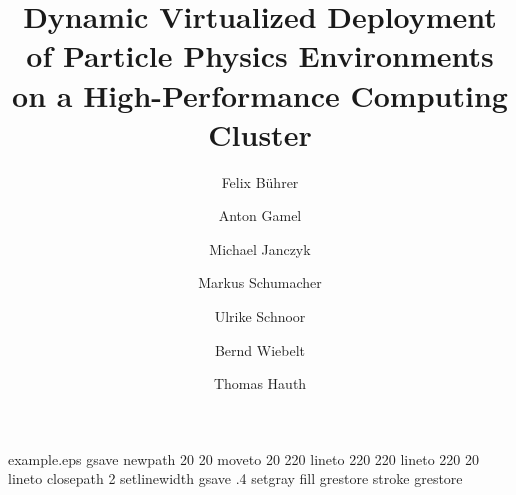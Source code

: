 %
%
%
%
%
\begin{filecontents*}{example.eps}
gsave
newpath
  20 20 moveto
  20 220 lineto
  220 220 lineto
  220 20 lineto
closepath
2 setlinewidth
gsave
  .4 setgray fill
grestore
stroke
grestore
\end{filecontents*}
%
\RequirePackage{fix-cm}
%
\documentclass[twocolumn]{svjour3}          %
%
\smartqed  %
%
\usepackage{graphicx}
%
%
\usepackage{url}
%
%
%


\title{Dynamic Virtualized Deployment of Particle Physics Environments on a
  High-Performance Computing Cluster%
}


\author{Felix B\"uhrer \and Anton Gamel  \and Michael Janczyk \and
  Markus Schumacher \and
  Ulrike Schnoor \and Bernd Wiebelt \and Thomas Hauth
}

